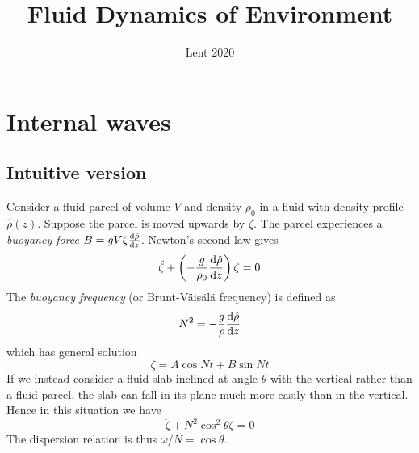 \documentclass{jknotes}
\begin{document}
\title{Fluid Dynamics of Environment}
\date{Lent 2020}

\maketitle
\suggestionsspiel
\tableofcontents

\section{Internal waves}

\subsection{Intuitive version}

\begin{center}
\end{center}
Consider a fluid parcel of volume $V$ and density $\rho_0$ in a fluid with
density profile $\hat{\rho}(z)$.  Suppose the parcel is moved upwards by
$\zeta$. The parcel experiences a \emph{buoyancy force} $B = g V \zeta
\frac{\diffd \hat{\rho}}{\diffd z}$. Newton's second law gives
\begin{equation}
	\ddot{\zeta} + \left(-\frac{g}{\rho_0} \frac{\diffd \hat{\rho}}{\diffd
	z}\right) \zeta = 0
\end{equation}
The \emph{buoyancy frequency} (or Brunt-V\"{a}is\"{a}l\"{a} frequency) is
defined as 
\begin{equation}
	N^2 = - \frac{g}{\rho} \frac{\diffd \hat{\rho}}{\diffd z}
\end{equation}
which has general solution
\begin{equation}
	\zeta = A \cos N t + B \sin N t
\end{equation}
If we instead consider a fluid slab inclined at angle $\theta$ with the
vertical rather than a fluid parcel, the slab can fall in its plane much more
easily than in the vertical. Hence in this situation we have
\begin{equation}
	\ddot{\zeta} + N^2 \cos^2\theta \zeta = 0
\end{equation}
The dispersion relation is thus $\omega/N = \cos \theta$.
\end{document}
